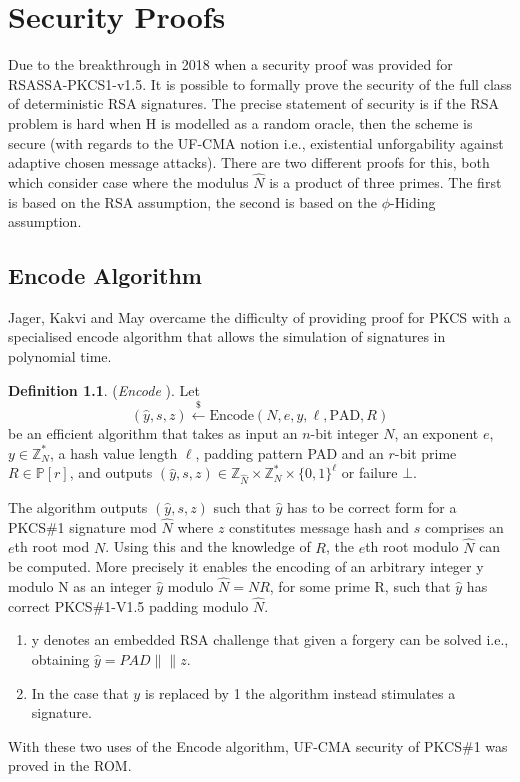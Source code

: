 \documentclass[]{final_report}
\theoremstyle{definition}
\newtheorem{definition}{Definition}[chapter]
\begin{document}
\chapter{Security Proofs}
Due to the breakthrough in 2018 when a security proof \cite{jager2018security}  was provided for RSASSA-PKCS1-v1.5. It is possible to formally prove the security of the full class of deterministic RSA signatures. The precise statement of security is if the RSA problem is hard when H is modelled as a random oracle, then the scheme is secure (with regards to the UF-CMA notion i.e.,  existential unforgability against adaptive chosen message attacks). There are two different proofs for this, both which consider case where the modulus $\widehat{N}$ is a product of three primes. The first is based on the RSA assumption, the second is based on the $\phi$-Hiding assumption.


\section{Encode Algorithm}


Jager, Kakvi and May overcame the difficulty of providing proof for PKCS with a specialised encode algorithm that allows the simulation of signatures in polynomial time.  

\begin{definition} (\textit{Encode} \cite{jager2018security}).
Let
\[
(\widehat{y}, s, z) \xleftarrow{\$} \text{Encode}(N, e, y, \ell, \text{PAD}, R)
\]
be an efficient algorithm that takes as input an \(n\)-bit integer \(N\), an exponent \(e\), \(y \in \mathbb{Z}_N^*\), a hash value length $\ell$, padding pattern PAD and an \(r\)-bit prime \(R \in \mathbb{P}[r]\), and outputs \((\widehat{y}, s, z) \in \mathbb{Z}_{\widehat{N}} \times \mathbb{Z}_N^* \times \{0, 1\}^\ell\) or failure \(\bot\). \

\end{definition}

The algorithm outputs \((\widehat{y}, s, z)\) such that \(\widehat{y}\) has to be correct form for a PKCS\#1 signature mod \(\widehat{N}\) where \(z\) constitutes message hash and \(s\) comprises an \(e\)th root mod \(N\). Using this and the knowledge of \(R\), the \(e\)th root modulo \(\widehat{N}\) can be computed. More precisely it enables the encoding of an arbitrary integer y modulo N as an integer $\hat{y}$ modulo $\hat{N} = NR$, for some prime R, such that $\widehat{y}$ has correct PKCS\#1-V1.5 padding modulo $\hat{N}$.

\begin{enumerate}
\item y denotes an embedded RSA challenge that given a forgery can be solved i.e., obtaining \(\widehat{y} = PAD\|\|z \). 
\item In the case that \(y\) is replaced by 1 the algorithm instead stimulates a signature. 
\end{enumerate}
With these two uses of the Encode algorithm, UF-CMA security of PKCS\#1 was proved in the ROM. 
\end{document}
